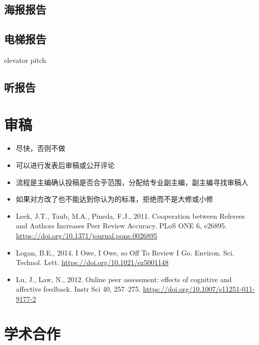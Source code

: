 \documentclass[]{tufte-book}
\begin{document}
\hypertarget{ux6d77ux62a5ux62a5ux544a}{%
\subsection{海报报告}\label{ux6d77ux62a5ux62a5ux544a}}

\hypertarget{ux7535ux68afux62a5ux544a}{%
\subsection{电梯报告}\label{ux7535ux68afux62a5ux544a}}

elevator pitch

\hypertarget{ux542cux62a5ux544a}{%
\subsection{听报告}\label{ux542cux62a5ux544a}}

\hypertarget{ux5ba1ux7a3f}{%
\section{审稿}\label{ux5ba1ux7a3f}}

\begin{itemize}
\item
  尽快，否则不做
\item
  可以进行发表后审稿或公开评论
\item
  流程是主编确认投稿是否合乎范围，分配给专业副主编，副主编寻找审稿人
\item
  如果对方改了也不能达到你认为的标准，拒绝而不是大修或小修
\item
  Leek, J.T., Taub, M.A., Pineda, F.J., 2011. Cooperation between Referees and Authors Increases Peer Review Accuracy. PLoS ONE 6, e26895. \url{https://doi.org/10.1371/journal.pone.0026895}
\item
  Logan, B.E., 2014. I Owe, I Owe, so Off To Review I Go. Environ. Sci. Technol. Lett. \url{https://doi.org/10.1021/ez5001148}
\item
  Lu, J., Law, N., 2012. Online peer assessment: effects of cognitive and affective feedback. Instr Sci 40, 257--275. \url{https://doi.org/10.1007/s11251-011-9177-2}
\end{itemize}

\hypertarget{ux5b66ux672fux5408ux4f5c}{%
\section{学术合作}\label{ux5b66ux672fux5408ux4f5c}}
\end{document}
